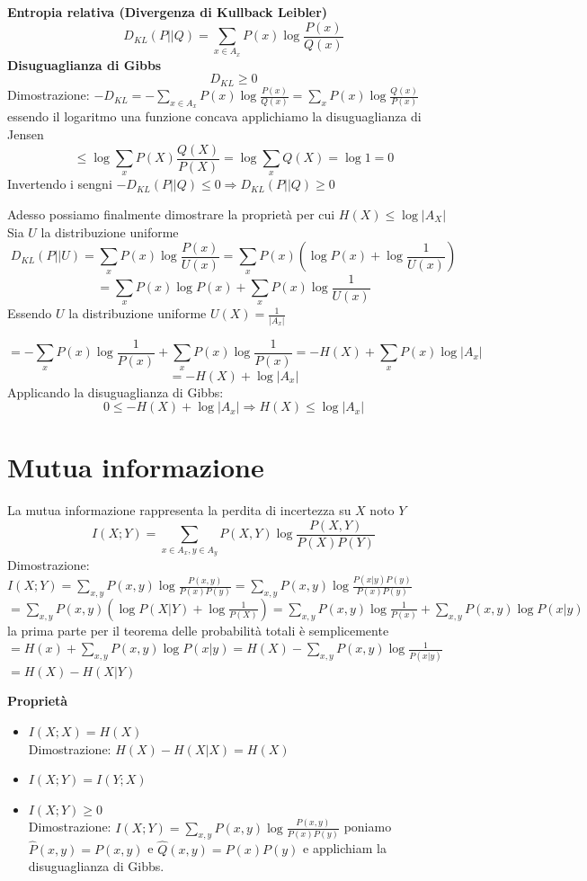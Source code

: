 \documentclass{report}
\begin{document}
\textbf{Entropia relativa (Divergenza di Kullback Leibler)}
$$D_{KL}(P||Q)=\sum_{x\in A_x}P(x)\log\frac{P(x)}{Q(x)}$$
\textbf{Disuguaglianza di Gibbs}
$$D_{KL}\ge 0$$
Dimostrazione: $-D_{KL}=-\sum_{x\in A_x}P(x)\log\frac{P(x)}{Q(x)}=\sum_{x}P(x)\log\frac{Q(x)}{P(x)}$
essendo il logaritmo una funzione concava applichiamo la disuguaglianza di Jensen
$$\le\log\sum_xP(X)\frac{Q(X)}{P(X)}=\log\sum_xQ(X)=\log1=0$$
Invertendo i sengni $-D_{KL}(P||Q)\le0 \Rightarrow D_{KL}(P||Q)\ge0$

Adesso possiamo finalmente dimostrare la proprietà per cui $H(X)\le\log\left|A_X\right|$
\\Sia $U$ la distribuzione uniforme
$$D_{KL}(P||U)=\sum_xP(x)\log\frac{P(x)}{U(x)}=\sum_xP(x)\left(\log P(x) +\log\frac{1}{U(x)}\right)$$
$$=\sum_xP(x)\log P(x)+\sum_xP(x)\log \frac{1}{U(x)}$$
Essendo $U$ la distribuzione uniforme $U(X)=\frac{1}{\left|A_x\right|}$

$$=-\sum_xP(x)\log \frac{1}{P(x)}+\sum_xP(x)\log \frac{1}{P(x)}=-H(X)+\sum_xP(x)\log{\left|A_x\right|} $$
$$=-H(X)+\log\left|A_x\right|$$
Applicando la disuguaglianza di Gibbs:
$$0\le -H(X)+\log\left|A_x\right| \Rightarrow H(X)\le\log\left|A_x\right|$$

\section{Mutua informazione}
La mutua informazione rappresenta la perdita di incertezza su $X$ noto $Y$
$$I(X;Y)=\sum_{x\in A_x, y\in A_y}P(X,Y)\log\frac{P(X,Y)}{P(X)P(Y)}$$
Dimostrazione: $I(X;Y)=\sum_{x,y}P(x,y)\log\frac{P(x,y)}{P(x)P(y)}=\sum_{x,y}P(x,y)\log\frac{P(x|y)P(y)}{P(x)P(y)}$
$=\sum_{x,y}P(x,y)(\log P(X|Y) + \log\frac{1}{P(X)})=\sum_{x,y}P(x,y)\log\frac{1}{P(x)}+\sum_{x,y}P(x,y)\log P(x|y )$
la prima parte per il teorema delle probabilità totali è semplicemente 
\\$= H(x)+\sum_{x,y}P(x,y)\log P(x|y)=H(X)-\sum_{x,y}P(x,y)\log\frac{1}{P(x|y)}$\\$=H(X)-H(X|Y)$

\textbf{Proprietà}
\begin{itemize}
    \item $I(X;X)=H(X)$
    \\Dimostrazione: $H(X)-H(X|X)=H(X)$
    \item  $I(X;Y)=I(Y;X)$
    \item $I(X;Y)\ge 0$
    \\Dimostrazione: $I(X;Y)=\sum_{x,y}P(x,y)\log\frac{P(x,y)}{P(x)P(y)}$ poniamo $\widehat{P}(x,y) = P(x,y)$ e $\widehat{Q}(x,y) = P(x)P(y)$ e applichiam la disuguaglianza di Gibbs.
\end{itemize}
\end{document}

